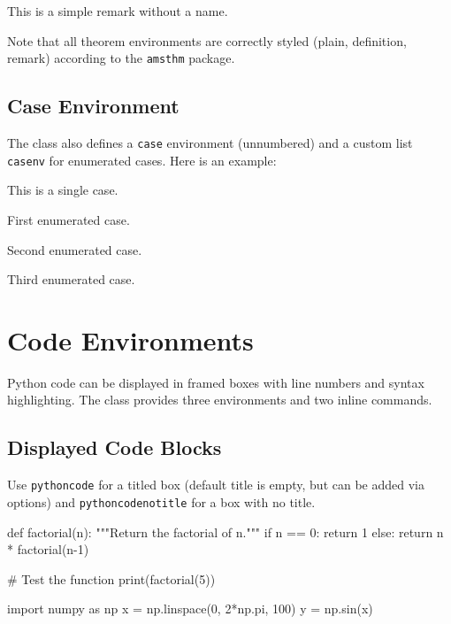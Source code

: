 \documentclass{myBook}
\begin{document}
\begin{remark}
This is a simple remark without a name.
\end{remark}

\begin{note}
Note that all theorem environments are correctly styled (plain, definition, remark) according to the \texttt{amsthm} package.
\end{note}

\section{Case Environment}
The class also defines a \texttt{case} environment (unnumbered) and a custom list \texttt{casenv} for enumerated cases. Here is an example:
\begin{case}
This is a single case.
\end{case}

\begin{casenv}
\item First enumerated case.
\item Second enumerated case.
\item Third enumerated case.
\end{casenv}

\chapter{Code Environments}
Python code can be displayed in framed boxes with line numbers and syntax highlighting. The class provides three environments and two inline commands.

\section{Displayed Code Blocks} \label{sec:code}
Use \texttt{pythoncode} for a titled box (default title is empty, but can be added via options) and \texttt{pythoncodenotitle} for a box with no title.
\begin{pythoncode}[title=Simple Python function]
def factorial(n):
    """Return the factorial of n."""
    if n == 0:
        return 1
    else:
        return n * factorial(n-1)

# Test the function
print(factorial(5))
\end{pythoncode}

\begin{pythoncodenotitle}
import numpy as np
x = np.linspace(0, 2*np.pi, 100)
y = np.sin(x)
\end{pythoncodenotitle}
\end{document}
